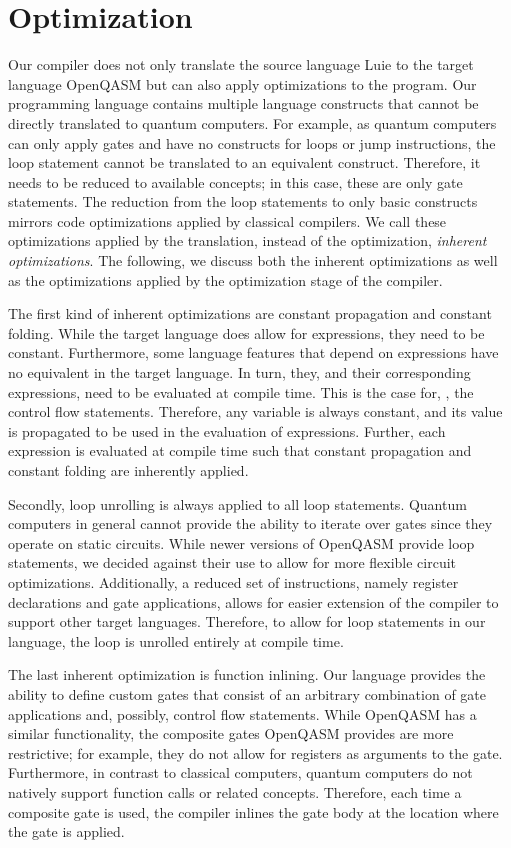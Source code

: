 \section{Optimization}
\label{sec:concept_optimization}
Our compiler does not only translate the source language Luie to the target language OpenQASM but can also apply optimizations to the program.
Our programming language contains multiple language constructs that cannot be directly translated to quantum computers. For example, as quantum computers can only apply gates and have no constructs for loops or jump instructions, the loop statement cannot be translated to an equivalent construct. Therefore, it needs to be reduced to available concepts; in this case, these are only gate statements. The reduction from the loop statements to only basic constructs mirrors code optimizations applied by classical compilers. We call these optimizations applied by the translation, instead of the optimization, \emph{inherent optimizations}.
The following, we discuss both the inherent optimizations as well as the optimizations applied by the optimization stage of the compiler.

The first kind of inherent optimizations are constant propagation and constant folding. 
While the target language does allow for expressions, they need to be constant. Furthermore, some language features that depend on expressions have no equivalent in the target language. In turn, they, and their corresponding expressions, need to be evaluated at compile time. This is the case for, \eg, the control flow statements. Therefore, any variable is always constant, and its value is propagated to be used in the evaluation of expressions. Further, each expression is evaluated at compile time such that constant propagation and constant folding are inherently applied.

Secondly, loop unrolling is always applied to all loop statements. 
Quantum computers in general cannot provide the ability to iterate over gates since they operate on static circuits. 
While newer versions of OpenQASM provide loop statements, we decided against their use to allow for more flexible circuit optimizations. Additionally, a reduced set of instructions, namely register declarations and gate applications, allows for easier extension of the compiler to support other target languages.
Therefore, to allow for loop statements in our language, the loop is unrolled entirely at compile time. 

The last inherent optimization is function inlining. Our language provides the ability to define custom gates that consist of an arbitrary combination of gate applications and, possibly, control flow statements. While OpenQASM has a similar functionality, the composite gates OpenQASM provides are more restrictive; for example, they do not allow for registers as arguments to the gate. Furthermore, in contrast to classical computers, quantum computers do not natively support function calls or related concepts. Therefore, each time a composite gate is used, the compiler inlines the gate body at the location where the gate is applied.

